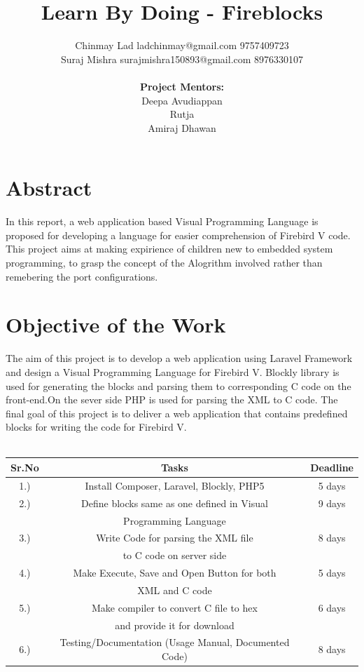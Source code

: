 \documentclass[a4paper,10pt]{report}
\title{Learn By Doing - Fireblocks}
\author{Chinmay Lad ladchinmay@gmail.com 9757409723\\Suraj Mishra surajmishra150893@gmail.com 8976330107\\\\ \textbf{Project Mentors:}\\Deepa Avudiappan\\Rutja\\Amiraj Dhawan}
\begin{document}
\maketitle
\tableofcontents

\chapter{Abstract}
In this report, a web application based Visual Programming Language is proposed for developing a language for easier
comprehension of Firebird V code. This project aims at making expirience of children new to embedded system programming,
to grasp the concept of the Alogrithm involved rather than remebering the port configurations. 


\chapter{Objective of the Work}
The aim of this project is to develop a web application using Laravel Framework and design a Visual Programming Language for Firebird V. 
Blockly library is used for generating the blocks and parsing them to corresponding C code on the front-end.On the sever side PHP is used for parsing the XML to C code.
The final goal of this project is to deliver a web application that contains predefined blocks for writing the code for Firebird V. \\\\
\begin{tabular}{ | c | c | c |}
	\hline\hline
	\bf Sr.No & \bf Tasks & \bf Deadline \\ 
	\hline
	1.) & Install Composer, Laravel, Blockly, PHP5 & 5 days \\
	\hline
	2.) & Define blocks same as one defined in Visual & 9 days \\
	& Programming Language &\\
	\hline
	3.) & Write Code for parsing the XML file  & 8 days \\
	& to C code on server side &\\
	\hline	
	4.) & Make Execute, Save and Open Button for both & 5 days \\
	& XML and C code &\\
	\hline
	5.) & Make compiler to convert C file to hex & 6 days\\
	& and provide it for download  &\\
	\hline
	6.) & Testing/Documentation (Usage Manual, Documented Code) & 8 days
	\\ \hline

\end{tabular}
\end{document}
